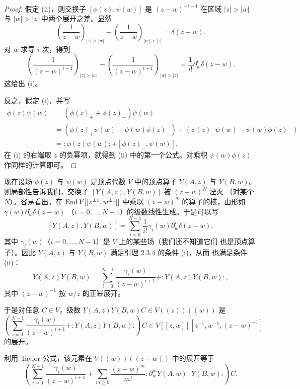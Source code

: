 \begin{proof}
    假定 (ii)，则交换子 $[\phi(z),\psi(w)]$ 是 $(z-w)^{-i-1}$ 在区域
    $|z|>|w|$ 与 $|w|>|z|$ 中两个展开之差。显然
    \[
        \left(\frac{1}{z-w}\right)_{|z|>|w|}
        -\left(\frac{1}{z-w}\right)_{|w|>|z|}
        =\delta(z-w).
    \]
    对 $w$ 求导 $i$ 次，得到
    \[
        \left(\frac{1}{(z-w)^{i+1}}\right)_{|z|>|w|}
        -\left(\frac{1}{(z-w)^{i+1}}\right)_{|w|>|z|}
        =\frac{1}{i!}\partial_w^i\delta(z-w).
    \]
    这给出 (i)。

    反之，假定 (i)，并写
    \[
        \begin{aligned}
            \phi(z)\psi(w)
            &=(\phi(z)_++\phi(z)_-)\psi(w)\\
            &=(\phi(z)_+\psi(w)+\psi(w)\phi(z)_-)
            +(\phi(z)_-\psi(w)-\psi(w)\phi(z)_-)\\
            &=:\!\phi(z)\psi(w)\!:+[\phi(z)_-,\psi(w)].
        \end{aligned}
    \]
    在 (i) 的右端取 $z$ 的负幂项，就得到 (ii) 中的第一个公式。对乘积
    $\psi(w)\phi(z)$ 作同样的计算即可。
\end{proof}

现在设场 $\phi(z)$ 与 $\psi(w)$ 是顶点代数 $V$ 中的顶点算子 $Y(A,z)$ 与
$Y(B,w)$。则局部性告诉我们，交换子 $[Y(A,z),Y(B,w)]$ 被 $(z-w)^N$ 湮灭
（对某个 $N$）。容易看出，在 $\operatorname{End} V[[z^{\pm1},w^{\pm1}]]$ 中乘以
$(z-w)^N$ 的算子的核，由形如 $\gamma(w)\partial_w^i\delta(z-w)$
（$i=0,\dots,N-1$）的级数线性生成。于是可以写
\[
    [Y(A,z),Y(B,w)]=\sum_{i=0}^{N-1}\frac{1}{i!}
    \gamma_i(w)\partial_w^i\delta(z-w),
\]
其中 $\gamma_i(w)$（$i=0,\dots,N-1$）是 $V$ 上的某些场（我们还不知道它们
也是顶点算子）。因此 $Y(A,z)$ 与 $Y(B,w)$ 满足引理 2.3.4 的条件 (i)，从而
也满足条件 (ii)：
\begin{equation}
    Y(A,z)Y(B,w)=\sum_{i=0}^{N-1}\frac{\gamma_i(w)}{(z-w)^{i+1}}
    +:\!Y(A,z)Y(B,w)\!:,
    \tag{2.3-2}
\end{equation}
其中 $(z-w)^{-1}$ 按 $w/z$ 的正幂展开。

于是对任意 $C\in V$，级数 $Y(A,z)Y(B,w)C\in V(\!(z)\!)(\!(w)\!)$ 是
\[
    \left(\sum_{i=0}^{N-1}\frac{\gamma_i(w)}{(z-w)^{i+1}}
    +:\!Y(A,z)Y(B,w)\!:\right)C
    \in V[[z,w]][z^{-1},w^{-1},(z-w)^{-1}]
\]
的展开。

利用 Taylor 公式，该元素在 $V(\!(w)\!)(\!(z-w)\!)$ 中的展开等于
\begin{equation}
    \left(\sum_{i=0}^{N-1}\frac{\gamma_i(w)}{(z-w)^{i+1}}
    +\sum_{m\ge0}\frac{(z-w)^m}{m!}
    :\!\partial_w^mY(A,w)\cdot Y(B,w)\!:\right)C.
    \tag{2.3-3}
\end{equation}


